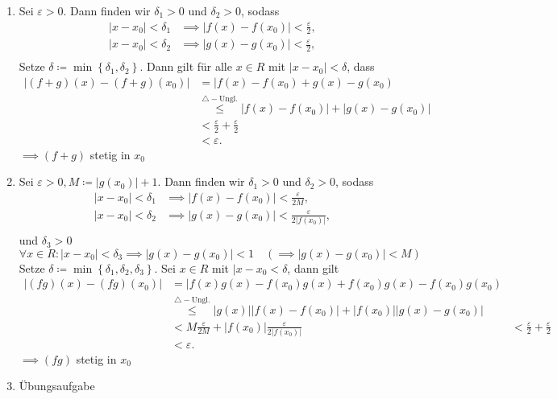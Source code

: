 \begin{subproof*}[Theorem 7.2.7.]
	\begin{enumerate}[label=(\roman*)]
		\item Sei $ \varepsilon > 0 $. Dann finden wir $ \delta_1 > 0 $ und $ \delta_2 > 0 $, sodass
			\begin{align*}
				|x - x_0| < \delta_1 &\implies |f(x) - f(x_0) | < \frac{ \varepsilon  }{ 2 } , \\
				|x - x_0| < \delta_2 &\implies |g(x) - g(x_0) | < \frac{ \varepsilon  }{ 2 } , \\
			\end{align*}
			Setze $ \delta \coloneqq \min \left\{ \delta_1, \delta_2 \right\}  $. 
			Dann gilt für alle $ x \in R $ mit $ |x-x_0| < \delta $, dass
			\begin{align*}
				| (f+g)(x) - (f+g)(x_0) | &= | f(x) - f(x_0) + g(x) - g(x_0) \\
				~&\overset{\triangle-\text{Ungl.} }{\leq } | f(x) - f(x_0)| + |g(x) - g(x_0)| \\
				~&< \frac{ \varepsilon  }{ 2 } + \frac{ \varepsilon  }{ 2 } \\
				~&< \varepsilon .
			\end{align*}
			$ \implies (f+g) $ stetig in $ x_0 $
		\item Sei $ \varepsilon > 0, M \coloneqq | g(x_0) | + 1 $.
			Dann finden wir $ \delta_1 > 0 $ und $ \delta_2 > 0 $, sodass
			\begin{align*}
				|x - x_0| < \delta_1 &\implies |f(x) - f(x_0) | < \frac{ \varepsilon  }{ 2M } , \\
				|x - x_0| < \delta_2 &\implies |g(x) - g(x_0) | < \frac{ \varepsilon  }{ 2|f(x_0)| } , \\
			\end{align*}
			und $ \delta_3 > 0 $
			\[
				\forall x \in R : | x - x_0 | < \delta_3 \implies  | g(x) - g(x_0) | < 1 \quad ( \implies  | g(x) - g(x_0) | < M )
			\]
			Setze $ \delta \coloneqq \min \left\{ \delta_1, \delta_2, \delta_3 \right\}  $.
			Sei $ x \in R $ mit $ | x - x_0 < \delta $, dann gilt
			\begin{align*}
				| (fg)(x) - (fg)(x_0) | &= | f(x)g(x) - f(x_0)g(x) + f(x_0)g(x) - f(x_0)g(x_0) \\
							&\overset{\triangle-\text{Ungl.} }{\leq } |g(x)| | f(x) - f(x_0)| + |f(x_0)||g(x) - g(x_0)| \\
							&< M \frac{ \varepsilon  }{ 2M } + |f(x_0) | \frac{ \varepsilon  }{ 2|f(x_0)| } 
							&< \frac{ \varepsilon  }{ 2 } + \frac{ \varepsilon  }{ 2 } \\
							&< \varepsilon .
			\end{align*}
			$ \implies (fg) $ stetig in $ x_0 $
		\item Übungsaufgabe
	\end{enumerate}
\end{subproof*}

